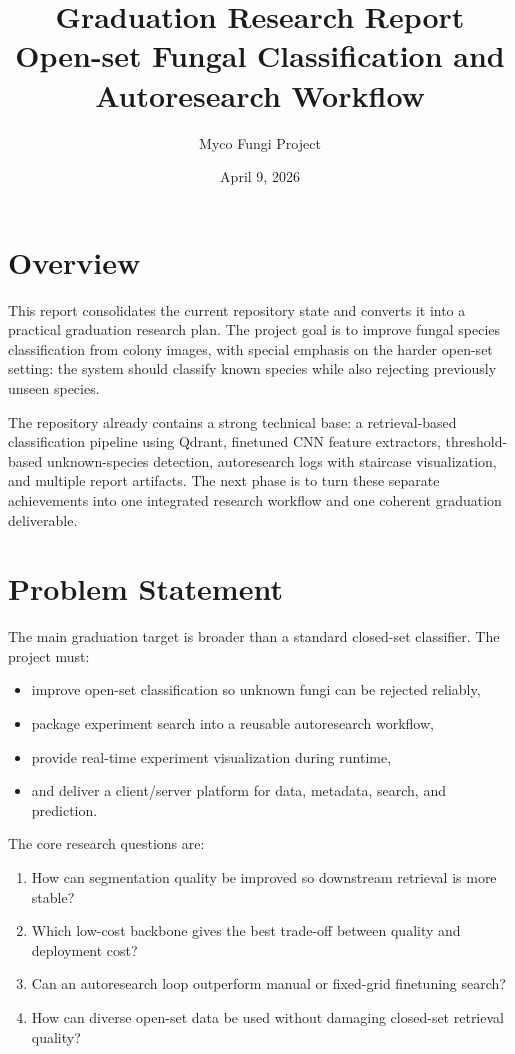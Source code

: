 \documentclass[11pt]{article}
\title{Graduation Research Report\\Open-set Fungal Classification and Autoresearch Workflow}
\author{Myco Fungi Project}
\date{April 9, 2026}
\begin{document}
\maketitle

\section{Overview}

This report consolidates the current repository state and converts it into a
practical graduation research plan. The project goal is to improve fungal
species classification from colony images, with special emphasis on the
harder open-set setting: the system should classify known species while also
rejecting previously unseen species.

The repository already contains a strong technical base: a retrieval-based
classification pipeline using Qdrant, finetuned CNN feature extractors,
threshold-based unknown-species detection, autoresearch logs with staircase
visualization, and multiple report artifacts. The next phase is to turn these
separate achievements into one integrated research workflow and one coherent
graduation deliverable.

\section{Problem Statement}

The main graduation target is broader than a standard closed-set classifier.
The project must:

\begin{itemize}
  \item improve open-set classification so unknown fungi can be rejected reliably,
  \item package experiment search into a reusable autoresearch workflow,
  \item provide real-time experiment visualization during runtime,
  \item and deliver a client/server platform for data, metadata, search, and prediction.
\end{itemize}

The core research questions are:

\begin{enumerate}
  \item How can segmentation quality be improved so downstream retrieval is more stable?
  \item Which low-cost backbone gives the best trade-off between quality and deployment cost?
  \item Can an autoresearch loop outperform manual or fixed-grid finetuning search?
  \item How can diverse open-set data be used without damaging closed-set retrieval quality?
\end{enumerate}
\end{document}
